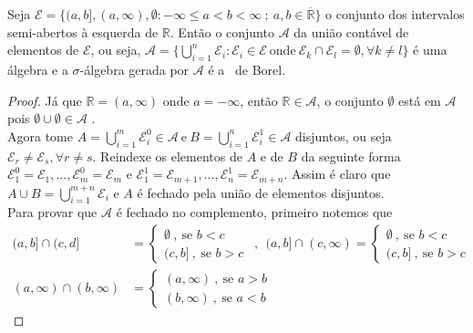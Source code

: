 \begin{proposicao} \label{prop3.2}
    Seja $\mathcal{E} = \{(a,b],(a,\infty),\emptyset: -\infty \leq a < b < \infty \ ; \ a,b \in \overline{\mathbb{R}}\}$ o conjunto dos intervalos semi-abertos à esquerda de $\mathbb{R}$. Então o conjunto $\mathcal{A}$ da união contável de elementos de $\mathcal{E}$, ou seja, $\mathcal{A}=\{ \bigcup _{i=1} ^n \mathcal{E}_i : \mathcal{E}_i \in \mathcal{E} \ \text{onde} \ \mathcal{E}_k \cap \mathcal{E}_l = \emptyset, \forall k \neq l  \}$ é uma álgebra e a $\sigma$-álgebra gerada por $\mathcal{A}$ é a \sig \ de Borel.
    
    \begin{proof}
        Já que $\mathbb{R} = (a,\infty)$ onde $a = -\infty$, então $\mathbb{R} \in \mathcal{A}$, o conjunto $\emptyset$ está em $\mathcal{A}$ pois $\emptyset \cup \emptyset \in \mathcal{A}$ . \\
        Agora tome $A = \bigcup _{i=1} ^m \mathcal{E}_i ^0 \in \mathcal{A} \ \text{e} \ B = \bigcup _{i=1} ^n \mathcal{E}_i ^1 \in \mathcal{A}$ disjuntos, ou seja $\mathcal{E}_r \neq \mathcal{E}_s, \forall r \neq s$. Reindexe os elementos de $A$ e de $B$ da seguinte forma $\mathcal{E}^0 _ 1 = \mathcal{E}_1 ,..., \mathcal{E}^0 _ m = \mathcal{E}_m$ e $\mathcal{E}^1 _ 1 = \mathcal{E}_{m+1} ,..., \mathcal{E}^1 _ n = \mathcal{E}_{m+n} $. Assim é claro que $A \cup B = \bigcup _{i=1} ^{m+n} \mathcal{E}_i$ e $A$ é fechado pela união de elementos disjuntos. \\
        Para provar que $\mathcal{A}$ é fechado no complemento, primeiro notemos que 
        \begin{align*}
            (a,b] \cap (c,d] &= 
            \begin{cases}
            \emptyset \ , \ \text{se } b < c \\
            (c,b] \ , \ \text{se } b>c         
            \end{cases}  
            \ \ , \ \ 
            (a,b] \cap (c,\infty) = 
            \begin{cases}
                \emptyset \ , \ \text{se } b < c \\
                (c,b] \ , \ \text{se } b>c         
                \end{cases}  \\
            (a,\infty) \cap (b,\infty) &= 
            \begin{cases}
                (a,\infty) \ , \ \text{se } a > b \\
                (b,\infty) \ , \ \text{se } a < b         

\end{cases}
\end{align*}
\end{proof}
\end{proposicao}
